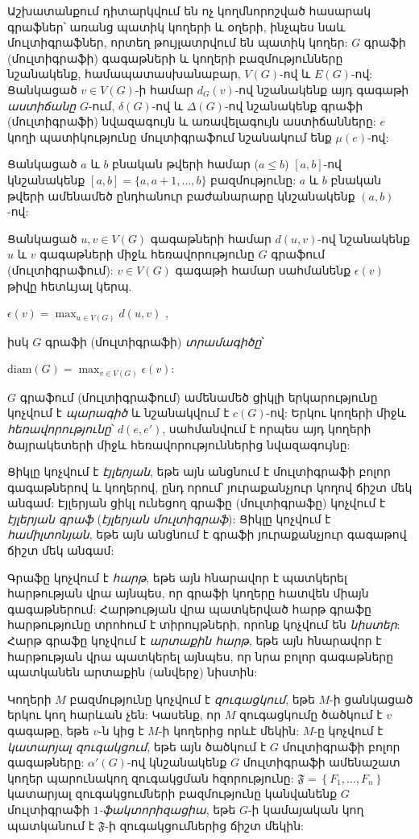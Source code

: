 
Աշխատանքում դիտարկվում են ոչ կողմնորոշված հասարակ գրաֆներ՝ առանց պատիկ կողերի և օղերի, ինչպես նաև մուլտիգրաֆներ, որտեղ թույլատրվում են պատիկ կողեր: $G$ գրաֆի (մուլտիգրաֆի) գագաթների և կողերի բազմությունները նշանակենք, համապատասխանաբար, $V(G)$-ով և $E(G)$-ով: Ցանկացած $v\in V(G)$-ի համար $d_G(v)$-ով նշանակենք այդ գագաթի \textit{աստիճանը} $G$-ում, $\delta(G)$-ով և $\Delta(G)$-ով նշանակենք գրաֆի (մուլտիգրաֆի) նվազագույն և առավելագույն աստիճանները: $e$ կողի պատիկությունը մուլտիգրաֆում նշանակում ենք $\mu(e)$-ով:

Ցանկացած $a$ և $b$ բնական թվերի համար ($a\leq b$) $[a,b]$-ով կնշանակենք $[a,b] = \{a,a+1,\ldots,b\}$ բազմությունը: $a$ և $b$ բնական թվերի ամենամեծ ընդհանուր բաժանարարը կնշանակենք $(a,b)$-ով:
 
Ցանկացած $u,v\in V(G)$ գագաթների համար $d(u,v)$-ով նշանակենք $u$ և $v$ գագաթների միջև հեռավորությունը $G$ գրաֆում (մուլտիգրաֆում): $v \in V(G)$ գագաթի համար սահմանենք $\epsilon(v)$ թիվը հետևյալ կերպ.
\begin{center}
$\epsilon(v) = \max_{u\in V(G)}{d(u,v)}$ ,
\end{center}
իսկ $G$ գրաֆի (մուլտիգրաֆի) \textit{տրամագիծը}՝ 
\begin{center}
$\mathrm{diam}(G) = \max_{v\in V(G)}{\epsilon(v)}$:
\end{center}

$G$ գրաֆում (մուլտիգրաֆում) ամենամեծ ցիկլի երկարությունը կոչվում է \textit{պարագիծ} և նշանակվում է $c(G)$-ով: Երկու կողերի միջև \textit{հեռավորությունը}՝ $d(e,e')$, սահմանվում է որպես այդ կողերի ծայրակետերի միջև հեռավորություններից նվազագույնը:

Ցիկլը կոչվում է \textit{էյլերյան}, եթե այն անցնում է մուլտիգրաֆի բոլոր գագաթներով և կողերով, ընդ որում՝ յուրաքանչյուր կողով ճիշտ մեկ անգամ: Էյլերյան ցիկլ ունեցող գրաֆը (մուլտիգրաֆը) կոչվում է \textit{էյլերյան գրաֆ} (\textit{էյլերյան մուլտիգրաֆ}): Ցիկլը կոչվում է \textit{համիլտոնյան}, եթե այն անցնում է գրաֆի յուրաքանչյուր գագաթով ճիշտ մեկ անգամ:

Գրաֆը կոչվում է \textit{հարթ}, եթե այն հնարավոր է պատկերել հարթության վրա այնպես, որ գրաֆի կողերը հատվեն միայն գագաթներում: Հարթության վրա պատկերված հարթ գրաֆը հարթությունը տրոհում է տիրույթների, որոնք կոչվում են \textit{նիստեր}: Հարթ գրաֆը կոչվում է \textit{արտաքին հարթ}, եթե այն հնարավոր է հարթության վրա պատկերել այնպես, որ նրա բոլոր գագաթները պատկանեն արտաքին (անվերջ) նիստին:

Կողերի $M$ բազմությունը կոչվում է \textit{զուգացկում}, եթե $M$-ի ցանկացած երկու կող հարևան չեն: Կասենք, որ $M$ զուգացկումը ծածկում է $v$ գագաթը, եթե $v$-ն կից է $M$-ի կողերից որևէ մեկին: $M$-ը կոչվում է \textit{կատարյալ զուգակցում}, եթե այն ծածկում է $G$ մուլտիգրաֆի բոլոր գագաթները: $\alpha'(G)$-ով կնշանակենք $G$ մուլտիգրաֆի ամենաշատ կողեր պարունակող զուգակցման հզորությունը: $\mathfrak{F} = \left\{F_1,\ldots,F_n \right\}$ կատարյալ զուգակցումների բազմությունը կանվանենք $G$ մուլտիգրաֆի \textit{$1$-ֆակտորիզացիա}, եթե $G$-ի կամայական կող պատկանում է $\mathfrak{F}$-ի զուգակցումներից ճիշտ մեկին:



